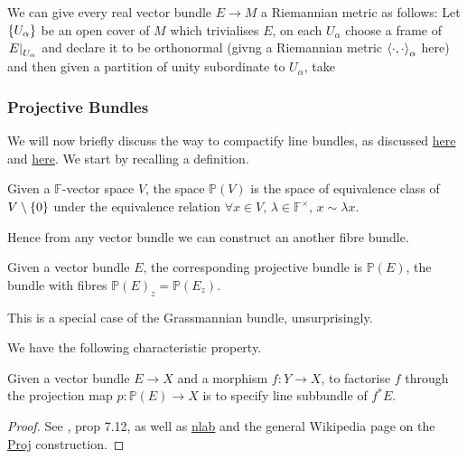 \documentclass{article}
\begin{document}
We can give every real vector bundle $E \to M$ a Riemannian metric as follows: Let $\left\{ U_\alpha \right\}$ be an open cover of $M$ which trivialises $E$, on each $U_\alpha$ choose a frame of $\left. E \right\rvert_{U_\alpha}$ and declare it to be orthonormal (givng a Riemannian metric $\left\langle \cdot,\cdot \right\rangle_\alpha$ here) and then given a partition of unity subordinate to $U_\alpha$, take 
\eq{
	\pangle{\cdot,\cdot} = \sum_\alpha \pangle{\cdot,\cdot}_\alpha
}

\subsubsection{Projective Bundles}
We will now briefly discuss the way to compactify line bundles, as discussed \href{https://math.stackexchange.com/questions/1380512/compactifying-mathcalo-mathbbp1-2}{here} and \href{https://en.wikipedia.org/wiki/Projective_bundle}{here}. We start by recalling a definition. 
\begin{definition}
	Given a $\mathbb{F}$-vector space $V$, the space $\mathbb{P}(V)$ is the space of equivalence class of $V \setminus \left\{ 0 \right\}$ under the equivalence relation $\forall x \in V, \, \lambda \in \mathbb{F}^\times, \, x \sim \lambda x$.  
\end{definition}
Hence from any vector bundle we can construct an another fibre bundle.
\begin{definition}
	Given a vector bundle $E$, the corresponding projective bundle is $\mathbb{P}(E)$, the bundle with fibres $\mathbb{P}(E)_z = \mathbb{P}(E_z)$. 
\end{definition}
\begin{remark}
	This is a special case of the Grassmannian bundle, unsurprisingly. 
\end{remark}
We have the following characteristic property. 
\begin{prop}
	Given a vector bundle $E \to X$ and a morphism $f:Y \to X$, to factorise $f$ through the projection map $p:\mathbb{P}(E) \to X$ is to specify line subbundle of $f^\ast E$.  
\end{prop}
\begin{proof}
	See \cite{Hartshorne1977}, prop 7.12, as well as \href{https://ncatlab.org/nlab/show/projective+bundle}{nlab} and the general Wikipedia page on the \href{https://en.wikipedia.org/wiki/Proj_construction}{Proj} construction.  
\end{proof}
\end{document}
